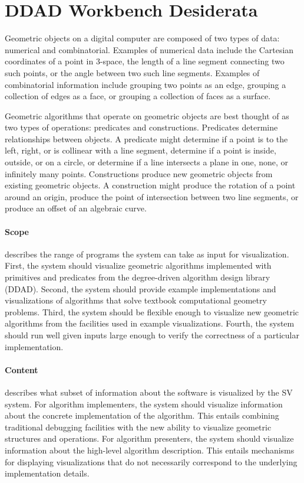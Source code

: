 \FloatBarrier
\section{DDAD Workbench Desiderata}

Geometric objects on a digital computer are composed of two types of data:
numerical and combinatorial. Examples of numerical data include the
Cartesian coordinates of a point in 3-space, the length of a line segment
connecting two such points, or the angle between two such line segments.
Examples of combinatorial information include grouping two points as an
edge, grouping a collection of edges as a face, or grouping a collection of
faces as a surface.

Geometric algorithms that operate on geometric objects are best thought of as
two types of operations: predicates and constructions. Predicates determine
relationships between objects. A predicate might determine if a point is to
the left, right, or is collinear with a line segment, determine if a point is
inside, outside, or on a circle, or determine if a line intersects a plane in
one, none, or infinitely many points. Constructions produce new geometric
objects from existing geometric objects. A construction might produce the
rotation of a point around an origin, produce the point of intersection
between two line segments, or produce an offset of an algebraic curve.

\paragraph{Scope} describes the range of programs the system can take as input
for visualization. First, the system should visualize geometric algorithms
implemented with primitives and predicates from the degree-driven algorithm
design library (DDAD). Second, the system should provide example implementations
and visualizations of algorithms that solve textbook computational geometry
problems. Third, the system should be flexible enough to visualize new geometric
algorithms from the facilities used in example visualizations. Fourth, the
system should run well given inputs large enough to verify the correctness of a
particular implementation.

\paragraph{Content} describes what subset of information about the software is
visualized by the SV system. For algorithm implementers, the system should
visualize information about the concrete implementation of the algorithm. This
entails combining traditional debugging facilities with the new ability to
visualize geometric structures and operations. For algorithm presenters, the
system should visualize information about the high-level algorithm description.
This entails mechanisms for displaying visualizations that do not necessarily
correspond to the underlying implementation details.

